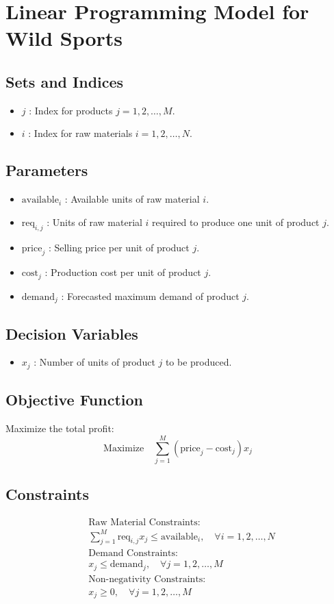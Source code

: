 \documentclass{article}
\begin{document}
\section*{Linear Programming Model for Wild Sports}

\subsection*{Sets and Indices}
\begin{itemize}
    \item \( j \) : Index for products \( j = 1, 2, \ldots, M \).
    \item \( i \) : Index for raw materials \( i = 1, 2, \ldots, N \).
\end{itemize}

\subsection*{Parameters}
\begin{itemize}
    \item \( \text{available}_i \) : Available units of raw material \( i \).
    \item \( \text{req}_{i,j} \) : Units of raw material \( i \) required to produce one unit of product \( j \).
    \item \( \text{price}_j \) : Selling price per unit of product \( j \).
    \item \( \text{cost}_j \) : Production cost per unit of product \( j \).
    \item \( \text{demand}_j \) : Forecasted maximum demand of product \( j \).
\end{itemize}

\subsection*{Decision Variables}
\begin{itemize}
    \item \( x_j \) : Number of units of product \( j \) to be produced.
\end{itemize}

\subsection*{Objective Function}
Maximize the total profit:
\[
\text{Maximize} \quad \sum_{j=1}^{M} (\text{price}_j - \text{cost}_j) x_j
\]

\subsection*{Constraints}
\begin{align*}
& \text{Raw Material Constraints:} \\
& \sum_{j=1}^{M} \text{req}_{i,j} x_j \leq \text{available}_i, \quad \forall i = 1, 2, \ldots, N \\
& \text{Demand Constraints:} \\
& x_j \leq \text{demand}_j, \quad \forall j = 1, 2, \ldots, M \\
& \text{Non-negativity Constraints:} \\
& x_j \geq 0, \quad \forall j = 1, 2, \ldots, M
\end{align*}
\end{document}
